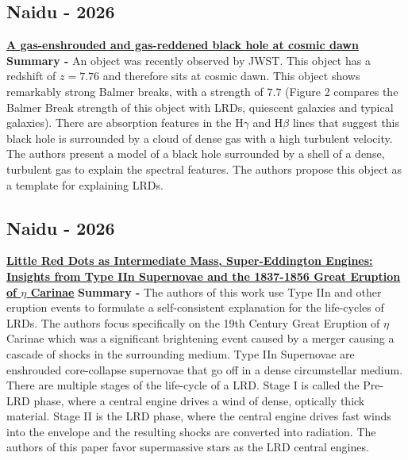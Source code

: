 \documentclass{article}
\begin{document}
\subsection*{Naidu - 2026}
\href{https://www.nature.com/articles/s41586-026-10846-4}{\textbf{A gas-enshrouded and gas-reddened black hole at cosmic dawn}}
\newline \textbf{Summary -} An object was recently observed by JWST. This object has a redshift of $z=7.76$ and therefore sits at cosmic dawn. This object shows remarkably strong Balmer breaks, with a strength of $7.7$ (Figure 2 compares the Balmer Break strength of this object with LRDs, quiescent galaxies and typical galaxies). There are absorption features in the H$\gamma$ and H$\beta$ lines that suggest this black hole is surrounded by a cloud of dense gas with a high turbulent velocity. The authors present a model of a black hole surrounded by a shell of a dense, turbulent gas to explain the spectral features. The authors propose this object as a template for explaining LRDs.

\subsection*{Naidu - 2026}
\href{https://ui.adsabs.harvard.edu/abs/2026arXiv260630711N}{\textbf{Little Red Dots as Intermediate Mass, Super-Eddington Engines: Insights from Type IIn Supernovae and the 1837-1856 Great Eruption of $\eta$ Carinae}}
\newline \textbf{Summary -} The authors of this work use Type IIn and other eruption events to formulate a self-consistent explanation for the life-cycles of LRDs. The authors focus specifically on the 19th Century Great Eruption of $\eta$ Carinae which was a significant brightening event caused by a merger causing a cascade of shocks in the surrounding medium. Type IIn Supernovae are enshrouded core-collapse supernovae that go off in a dense circumstellar medium. There are multiple stages of the life-cycle of a LRD. Stage I is called the Pre-LRD phase, where a central engine drives a wind of dense, optically thick material. Stage II is the LRD phase, where the central engine drives fast winds into the envelope and the resulting shocks are converted into radiation. The authors of this paper favor supermassive stars as the LRD central engines.
\end{document}
